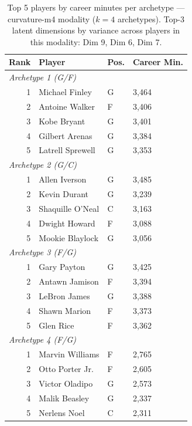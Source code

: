 \begin{table}[htbp]
  \centering\small
  \begin{tabular}{rlll}
    \toprule
    Rank & Player & Pos. & Career Min. \\
    \midrule
    \multicolumn{4}{l}{\textit{Archetype 1 (G/F)}} \\
    \midrule
    1 & Michael Finley & G & 3,464 \\
    2 & Antoine Walker & F & 3,406 \\
    3 & Kobe Bryant & G & 3,401 \\
    4 & Gilbert Arenas & G & 3,384 \\
    5 & Latrell Sprewell & G & 3,353 \\
    \midrule[0.4pt]
    \multicolumn{4}{l}{\textit{Archetype 2 (G/C)}} \\
    \midrule
    1 & Allen Iverson & G & 3,485 \\
    2 & Kevin Durant & G & 3,239 \\
    3 & Shaquille O'Neal & C & 3,163 \\
    4 & Dwight Howard & F & 3,088 \\
    5 & Mookie Blaylock & G & 3,056 \\
    \midrule[0.4pt]
    \multicolumn{4}{l}{\textit{Archetype 3 (F/G)}} \\
    \midrule
    1 & Gary Payton & G & 3,425 \\
    2 & Antawn Jamison & F & 3,394 \\
    3 & LeBron James & G & 3,388 \\
    4 & Shawn Marion & F & 3,373 \\
    5 & Glen Rice & F & 3,362 \\
    \midrule[0.4pt]
    \multicolumn{4}{l}{\textit{Archetype 4 (F/G)}} \\
    \midrule
    1 & Marvin Williams & F & 2,765 \\
    2 & Otto Porter Jr. & F & 2,605 \\
    3 & Victor Oladipo & G & 2,573 \\
    4 & Malik Beasley & G & 2,337 \\
    5 & Nerlens Noel & C & 2,311 \\
    \bottomrule
  \end{tabular}
  \caption{Top 5 players by career minutes per archetype --- curvature-m4 modality ($k=4$ archetypes). Top-3 latent dimensions by variance across players in this modality: Dim 9, Dim 6, Dim 7.}
  \label{tab:arch_reps_curvature_m4}
\end{table}

